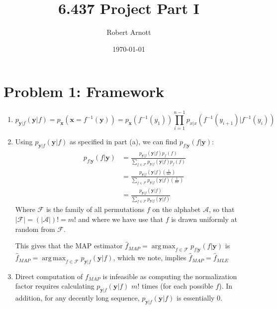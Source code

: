 \documentclass[secnumaric,notitlepage,amsmath,amssymb,nofootinbib,floatfix,12pt]{revtex4-1}
\DeclareMathOperator*{\argmax}{arg\,max}
\begin{document}
\title{6.437 Project Part I}
\author{Robert Arnott}
\date{\today}

\maketitle
\section*{Problem 1: Framework}
\begin{enumerate}[label=(\alph*)]
\item 
\begin{equation}
p_{\mathbf{y}|f}(\mathbf{y}|f) = p_{\mathbf{x}}(\mathbf{x} = f^{-1}(\mathbf{y})) = p_{\mathbf{x}}(f^{-1}(y_1)) \prod_{i=1}^{n-1} p_{x|x}(f^{-1}(y_{i+1})|f^{-1}(y_{i}))
\end{equation}
\item Using $p_{\mathbf{y}|f}(\mathbf{y}|f)$ as specified in part (a), we can find $p_{f|\mathbf{y}}(f|\mathbf{y})$:
\begin{equation}
\begin{split}
p_{f|\mathbf{y}}(f|\mathbf{y}) &= \frac{p_{\mathbf{y}|f}(\mathbf{y}|f)p_f(f)}{\sum_{f \in \mathcal{F}} p_{\mathbf{y}|f}(\mathbf{y}|f)p_f(f)} \\
&= \frac{p_{\mathbf{y}|f}(\mathbf{y}|f)(\frac{1}{m!})}{\sum_{f \in \mathcal{F}} p_{\mathbf{y}|f}(\mathbf{y}|f)(\frac{1}{m!})} \\
&= \frac{p_{\mathbf{y}|f}(\mathbf{y}|f)}{\sum_{f \in \mathcal{F}} p_{\mathbf{y}|f}(\mathbf{y}|f)}
\end{split}
\end{equation}
Where $\mathcal{F}$ is the family of all permutations $f$ on the alphabet $\mathcal{A}$, so that $|\mathcal{F}| = (|\mathcal{A}|)! = m!$ and where we have use that $f$ is drawn uniformly at random from $\mathcal{F}$.\par
This gives that the MAP estimator $\hat{f}_{MAP} = \argmax_{f\in \mathcal{F}} p_{f|\mathbf{y}}(f|\mathbf{y})$ is $\hat{f}_{MAP} = \argmax_{f\in \mathcal{F}} p_{\mathbf{y}|f}(\mathbf{y}|f)$, which we note, implies $\hat{f}_{MAP} = \hat{f}_{MLE}$
\item Direct computation of $f_{MAP}$ is infeasible as computing the normalization factor requires calculating $p_{\mathbf{y}|f}(\mathbf{y}|f)$ $m!$ times (for each possible $f$). In addition, for any decently long sequence, $p_{\mathbf{y}|f}(\mathbf{y}|f)$ is essentially $0$.
\end{enumerate}
\end{document}
